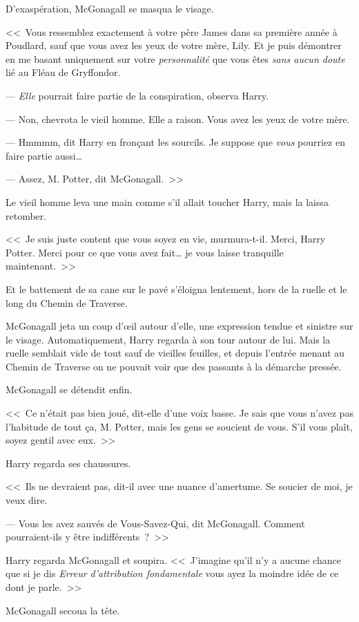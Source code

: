 D'exaspération, McGonagall se masqua le visage. 

<<~Vous ressemblez exactement à votre père James dans sa première année à Poudlard, sauf que vous avez les yeux de votre mère, Lily. Et je puis démontrer en me basant uniquement sur votre \emph{personnalité} que vous êtes \emph{sans aucun doute} lié au Fléau de Gryffondor.

--- \emph{Elle} pourrait faire partie de la conspiration, observa Harry.

--- Non, chevrota le vieil homme. Elle a raison. Vous avez les yeux de votre mère.

--- Hmmmm, dit Harry en fronçant les sourcils. Je suppose que \emph{vous} pourriez en faire partie aussi…

--- Assez, M. Potter, dit McGonagall.~>>

Le vieil homme leva une main comme s'il allait toucher Harry, mais la laissa retomber.

<<~Je suis juste content que vous soyez en vie, murmura-t-il. Merci, Harry Potter. Merci pour ce que vous avez fait… je vous laisse tranquille maintenant.~>>

Et le battement de sa cane sur le pavé s'éloigna lentement, hors de la ruelle et le long du Chemin de Traverse.

McGonagall jeta un coup d'œil autour d'elle, une expression tendue et sinistre sur le visage. Automatiquement, Harry regarda à son tour autour de lui. Mais la ruelle semblait vide de tout sauf de vieilles feuilles, et depuis l'entrée menant au Chemin de Traverse on ne pouvait voir que des passants à la démarche pressée.

McGonagall se détendit enfin.

<<~Ce n'était pas bien joué, dit-elle d'une voix basse. Je sais que vous n'avez pas l'habitude de tout ça, M. Potter, mais les gens se soucient de vous. S'il vous plaît, soyez gentil avec eux.~>>

Harry regarda ses chaussures.

<<~Ils ne devraient pas, dit-il avec une nuance d'amertume. Se soucier de moi, je veux dire.

--- Vous les avez sauvés de Vous-Savez-Qui, dit McGonagall. Comment pourraient-ils y être indifférents~?~>>

Harry regarda McGonagall et soupira. <<~J'imagine qu'il n'y a aucune chance que si je dis \emph{Erreur d'attribution fondamentale} vous ayez la moindre idée de ce dont je parle.~>>

McGonagall secoua la tête.

